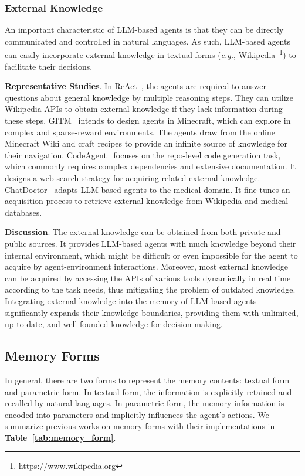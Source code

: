 \documentclass{article}
\theoremstyle{definition}
\theoremstyle{theorem}
\theoremstyle{proof}
\theoremstyle{remark}
\begin{document}
	\subsubsection{External Knowledge}
	An important characteristic of LLM-based agents is that they can be directly communicated and controlled in natural languages. 
	As such, LLM-based agents can easily incorporate external knowledge in textual forms (\emph{e.g.}, Wikipedia~\footnote{\url{https://www.wikipedia.org}}) to facilitate their decisions.
	
	\textbf{Representative Studies}.
	In ReAct~\cite{react}, the agents are required to answer questions about general knowledge by multiple reasoning steps. They can utilize Wikipedia APIs to obtain external knowledge if they lack information during these steps. 
	GITM~\cite{gitm} intends to design agents in Minecraft, which can explore in complex and sparse-reward environments. The agents draw from the online Minecraft Wiki and craft recipes to provide an infinite source of knowledge for their navigation.
	CodeAgent~\cite{codeagent} focuses on the repo-level code generation task, which commonly requires complex dependencies and extensive documentation. It designs a web search strategy for acquiring related external knowledge. ChatDoctor~\cite{chatdoctor} adapts LLM-based agents to the medical domain. It fine-tunes an acquisition process to retrieve external knowledge from Wikipedia and medical databases.
	
	\textbf{Discussion}.
	The external knowledge can be obtained from both private and public sources. It provides LLM-based agents with much knowledge beyond their internal environment, which might be difficult or even impossible for the agent to acquire by agent-environment interactions. Moreover, most external knowledge can be acquired by accessing the APIs of various tools dynamically in real time according to the task needs, thus mitigating the problem of outdated knowledge.
	Integrating external knowledge into the memory of LLM-based agents significantly expands their knowledge boundaries, providing them with unlimited, up-to-date, and well-founded knowledge for decision-making. 
	
	
	\subsection{Memory Forms}
	In general, there are two forms to represent the memory contents: textual form and parametric form. 
	In textual form, the information is explicitly retained and recalled by natural languages. 
	In parametric form, the memory information is encoded into parameters and implicitly influences the agent's actions.
	We summarize previous works on memory forms with their implementations in \textbf{Table~\ref{tab:memory_form}}.
	
\end{document}
